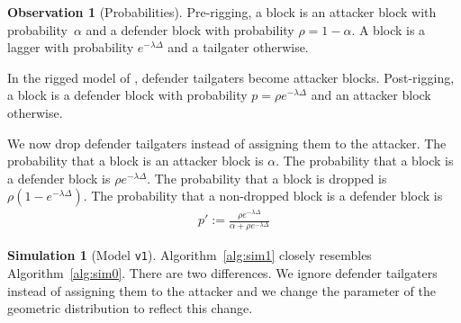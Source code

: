 \documentclass[12pt]{article}
\theoremstyle{definition}
\newtheorem{observation}{Observation}
\newtheorem{simulation}{Simulation}
\begin{document}
\begin{observation}[Probabilities]\label{obs:ptick}
  Pre-rigging, a block is an attacker block with probability~$\alpha$ and a defender block with probability $\rho = 1 - \alpha$. A block is a lagger with probability $e^{-\lambda\Delta}$ and a tailgater otherwise.

  In the rigged model of \citet{guo2022BitcoinLatency}, defender tailgaters become attacker blocks.
  Post-rigging, a block is a defender block with probability $p = \rho e^{-\lambda\Delta}$ and an attacker block otherwise.

  We now drop defender tailgaters instead of assigning them to the attacker.
  The probability that a block is an attacker block is $\alpha$.
  The probability that a block is a defender block is $\rho e^{-\lambda\Delta}$.
  The probability that a block is dropped is $\rho (1 - e^{-\lambda\Delta})$.
  The probability that a non-dropped block is a defender block is
  \begin{align}
    p' := \frac{\rho e^{-\lambda\Delta}}{\alpha + \rho e^{-\lambda\Delta}}
  \end{align}
\end{observation}

\begin{simulation}[Model \texttt{v1}] \label{sim:v1}
  Algorithm~\ref{alg:sim1} closely resembles Algorithm~\ref{alg:sim0}.
  There are two differences. We ignore defender tailgaters instead of assigning them to the attacker and we change the parameter of the geometric distribution to reflect this change.
\end{simulation}
\end{document}
